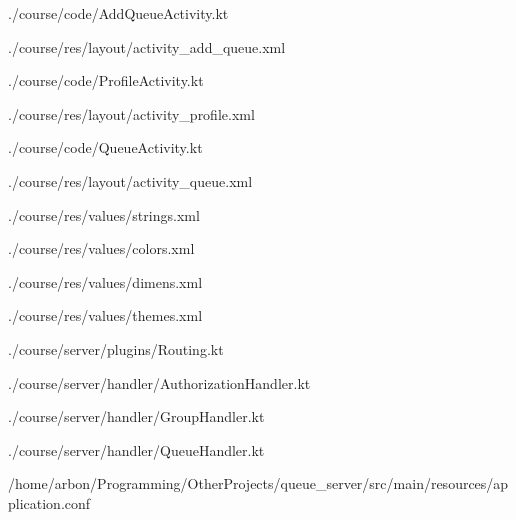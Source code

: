 \label{lst:activity:queue:add}

{./course/code/AddQueueActivity.kt}

{./course/res/layout/activity_add_queue.xml}

\label{lst:activity:profile}

{./course/code/ProfileActivity.kt}

{./course/res/layout/activity_profile.xml}

\label{lst:activity:queue}

{./course/code/QueueActivity.kt}

{./course/res/layout/activity_queue.xml}


{./course/res/values/strings.xml}

{./course/res/values/colors.xml}

{./course/res/values/dimens.xml}

{./course/res/values/themes.xml}


\label{lst:routing}

{./course/server/plugins/Routing.kt}

{./course/server/handler/AuthorizationHandler.kt}

{./course/server/handler/GroupHandler.kt}

{./course/server/handler/QueueHandler.kt}

\label{lst:config}

{/home/arbon/Programming/OtherProjects/queue_server/src/main/resources/application.conf}


